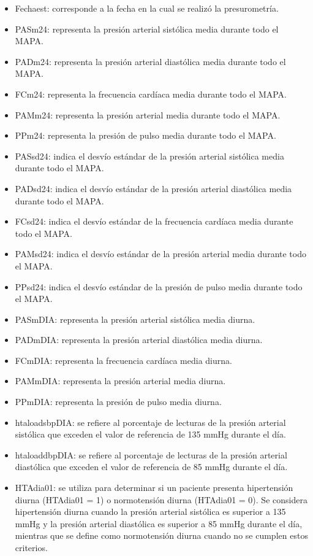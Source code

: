 \begin{itemize}
  \item Fechaest: corresponde a la fecha en la cual se realizó la presurometría.
  \item PASm24: representa la presión arterial sistólica media durante todo el MAPA.
	\item PADm24: representa la presión arterial diastólica media durante todo el MAPA.
  \item FCm24: representa la frecuencia cardíaca media durante todo el MAPA.
  \item PAMm24: representa la presión arterial media durante todo el MAPA.
  \item PPm24: representa la presión de pulso media durante todo el MAPA.
  \item PASsd24: indica el desvío estándar de la presión arterial sistólica media durante todo el MAPA. 
  \item PADsd24: indica el desvío estándar de la presión arterial diastólica media durante todo el MAPA.
  \item FCsd24:  indica el desvío estándar de la frecuencia cardíaca media durante todo el MAPA.
  \item PAMsd24: indica el desvío estándar de la presión arterial media durante todo el MAPA.
  \item PPsd24: indica el desvío estándar de la presión de pulso media durante todo el MAPA.
  \item PASmDIA: representa la presión arterial sistólica media diurna.
  \item PADmDIA: representa la presión arterial diastólica media diurna.
  \item FCmDIA: representa la frecuencia cardíaca media diurna.
  \item PAMmDIA: representa la presión arterial media diurna.
  \item PPmDIA: representa la presión de pulso media diurna.
  \item htaloadsbpDIA: se refiere al porcentaje de lecturas de la presión arterial sistólica que exceden el valor de referencia de 135 mmHg durante el día.
  \item htaloaddbpDIA: se refiere al porcentaje de lecturas de la presión arterial diastólica que exceden el valor de referencia de 85 mmHg durante el día.
  \item HTAdia01: se utiliza para determinar si un paciente presenta hipertensión diurna (HTAdia01 = 1) o normotensión diurna (HTAdia01 = 0). Se considera hipertensión diurna cuando la presión arterial sistólica es superior a 135 mmHg y la presión arterial diastólica es superior a 85 mmHg durante el día, mientras que se define como normotensión diurna cuando no se cumplen estos criterios.

\end{itemize}
